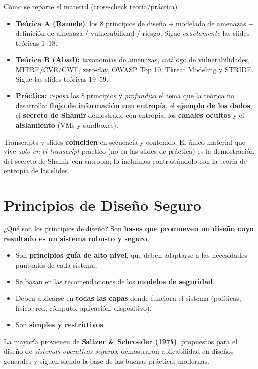 \documentclass[11pt,a4paper]{article}
\begin{document}
\begin{practbox}{Cómo se reparte el material (cross-check teoría/práctica)}
\begin{itemize}[leftmargin=1.3em,itemsep=2pt]
  \item \textbf{Teórica A (Ramele):} los 8 principios de diseño + modelado de amenazas +
        definición de amenaza / vulnerabilidad / riesgo. Sigue \emph{exactamente} las slides
        teóricas 1--18.
  \item \textbf{Teórica B (Abad):} taxonomías de amenazas, catálogo de vulnerabilidades,
        MITRE/CVE/CWE, zero-day, OWASP Top 10, Threat Modeling y STRIDE. Sigue las slides
        teóricas 19--59.
  \item \textbf{Práctica:} \emph{repasa} los 8 principios y \emph{profundiza} el tema que la
        teórica no desarrolla: \textbf{flujo de información con entropía}, el \textbf{ejemplo
        de los dados}, el \textbf{secreto de Shamir} demostrado con entropía, los
        \textbf{canales ocultos} y el \textbf{aislamiento} (VMs y sandboxes).
\end{itemize}
Transcripts y slides \textbf{coinciden} en secuencia y contenido. El único material que vive
\emph{solo en el transcript} práctico (no en las slides de práctica) es la demostración del
secreto de Shamir con entropía; lo incluimos contrastándolo con la teoría de entropía de las
slides.
\end{practbox}

\section{Principios de Diseño Seguro}

\begin{defbox}{¿Qué son los principios de diseño?}
Son \textbf{bases que promueven un diseño cuyo resultado es un sistema robusto y seguro}.
\begin{itemize}[leftmargin=1.4em,itemsep=1pt]
  \item Son \textbf{principios guía de alto nivel}, que deben adaptarse a las necesidades
        puntuales de cada sistema.
  \item Se basan en las recomendaciones de los \textbf{modelos de seguridad}.
  \item Deben aplicarse en \textbf{todas las capas} donde funciona el sistema (políticas,
        físico, red, cómputo, aplicación, dispositivo).
  \item Son \textbf{simples y restrictivos}.
\end{itemize}
La mayoría provienen de \textbf{Saltzer \& Schroeder (1975)}, propuestos para el diseño de
\emph{sistemas operativos seguros}; demostraron aplicabilidad en diseños generales y siguen
siendo la base de las buenas prácticas modernas.
\end{defbox}
\end{document}
